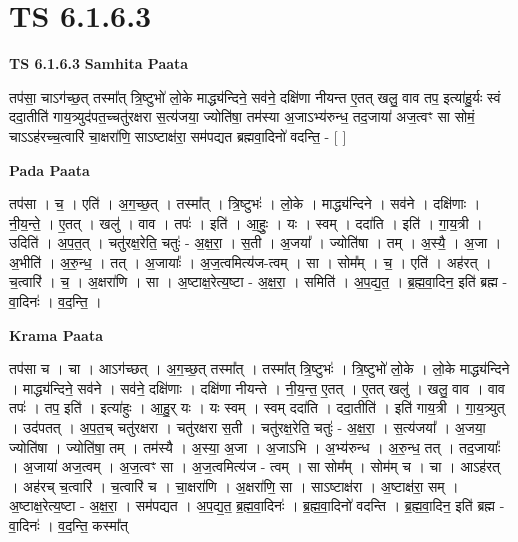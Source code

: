 \documentclass[17pt]{extarticle}
\begin{document}
\section{ TS 6.1.6.3 }

\textbf{TS 6.1.6.3 } \newline
\textbf{Samhita Paata} \newline

तप॑सा॒ चाऽग॑च्छ॒त् तस्मा᳚त् त्रि॒ष्टुभो॑ लो॒के माद्ध्य॑न्दिने॒ सव॑ने॒ दक्षि॑णा नीयन्त ए॒तत् खलु॒ वाव तप॒ इत्या॑हु॒र्यः स्वं ददा॒तीति॑ गाय॒त्र्युद॑पत॒च्चतु॑रक्षरा स॒त्य॑जया॒ ज्योति॑षा॒ तम॑स्या अ॒जाऽभ्य॑रुन्ध॒ तद॒जाया॑ अज॒त्वꣳ सा सोमं॒ चाऽऽह॑रच्च॒त्वारि॑ चा॒क्षरा॑णि॒ साऽष्टाक्ष॑रा॒ सम॑पद्यत ब्रह्मवा॒दिनो॑ वदन्ति॒ - [  ] \newline

\textbf{Pada Paata} \newline

तप॑सा । च॒ । एति॑ । अ॒ग॒च्छ॒त् । तस्मा᳚त् । त्रि॒ष्टुभः॑ । लो॒के । माद्ध्य॑न्दिने । सव॑ने । दक्षि॑णाः । नी॒य॒न्ते॒ । ए॒तत् । खलु॑ । वाव । तपः॑ । इति॑ । आ॒हुः॒ । यः । स्वम् । ददा॑ति । इति॑ । गा॒य॒त्री । उदिति॑ । अ॒प॒त॒त् । चतु॑रक्ष॒रेति॒ चतुः॑ - अ॒क्ष॒रा॒ । स॒ती । अ॒जया᳚ । ज्योति॑षा । तम् । अ॒स्यै॒ । अ॒जा । अ॒भीति॑ । अ॒रु॒न्ध॒ । तत् । अ॒जायाः᳚ । अ॒ज॒त्वमित्य॑ज-त्वम् । सा । सोम᳚म् । च॒ । एति॑ । अह॑रत् । च॒त्वारि॑ । च॒ । अ॒क्षरा॑णि । सा । अ॒ष्टाक्ष॒रेत्य॒ष्टा - अ॒क्ष॒रा॒ । समिति॑ । अ॒प॒द्य॒त॒ । ब्र॒ह्म॒वा॒दिन॒ इति॑ ब्रह्म - वा॒दिनः॑ । व॒द॒न्ति॒ ।  \newline


\textbf{Krama Paata} \newline

तप॑सा च । चा । आऽग॑च्छत् । अ॒ग॒च्छ॒त् तस्मा᳚त् । तस्मा᳚त् त्रि॒ष्टुभः॑ । त्रि॒ष्टुभो॑ लो॒के । लो॒के माद्ध्य॑न्दिने । माद्ध्य॑न्दिने॒ सव॑ने । सव॑ने॒ दक्षि॑णाः । दक्षि॑णा नीयन्ते । नी॒य॒न्त॒ ए॒तत् । ए॒तत् खलु॑ । खलु॒ वाव । वाव तपः॑ । तप॒ इति॑ । इत्या॑हुः । आ॒हु॒र् यः । यः स्वम् । स्वम् ददा॑ति । ददा॒तीति॑ । इति॑ गाय॒त्री । गा॒य॒त्र्युत् । उद॑पतत् । अ॒प॒त॒च् चतु॑रक्षरा । चतु॑रक्षरा स॒ती । चतु॑रक्ष॒रेति॒ चतुः॑ - अ॒क्ष॒रा॒ । स॒त्य॑जया᳚ । अ॒जया॒ ज्योति॑षा । ज्योति॑षा॒ तम् । तम॑स्यै । अ॒स्या॒ अ॒जा । अ॒जाऽभि । अ॒भ्य॑रुन्ध । अ॒रु॒न्ध॒ तत् । तद॒जायाः᳚ । अ॒जाया॑ अज॒त्वम् । अ॒ज॒त्वꣳ सा । अ॒ज॒त्वमित्य॑ज - त्वम् । सा सोम᳚म् । सोम॑म् च । चा । आऽह॑रत् । अह॑रच् च॒त्वारि॑ । च॒त्वारि॑ च । चा॒क्षरा॑णि । अ॒क्षरा॑णि॒ सा । साऽष्टाक्ष॑रा । अ॒ष्टाक्ष॑रा॒ सम् । अ॒ष्टाक्ष॒रेत्य॒ष्टा - अ॒क्ष॒रा॒ । सम॑पद्यत । अ॒प॒द्य॒त॒ ब्र॒ह्म॒वा॒दिनः॑ । ब्र॒ह्म॒वा॒दिनो॑ वदन्ति । ब्र॒ह्म॒वा॒दिन॒ इति॑ ब्रह्म - वा॒दिनः॑ । व॒द॒न्ति॒ कस्मा᳚त् \newline
\end{document}
